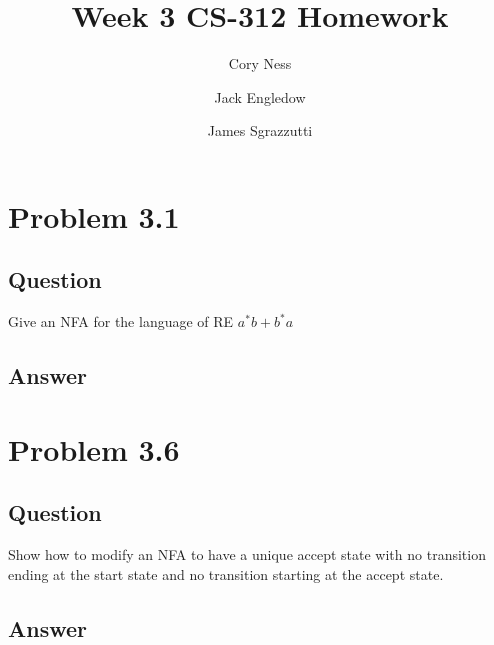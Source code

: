 \documentclass[12pt, a4paper]{article}
\title{Week 3 CS-312 Homework}
\author{
	Cory Ness
	\and
	Jack Engledow
	\and
	James Sgrazzutti
}
\begin{document}
\maketitle

\section{Problem 3.1}
\subsection{Question}
Give an NFA for the language of RE $a^{*}b+b^{*}a$
\subsection{Answer}

\section{Problem 3.6}
\subsection{Question}
Show how to modify an NFA to have a unique accept state with no transition ending at the start state and no transition starting at the accept state.
\subsection{Answer}

\section{Problem 3.7}
\subsection{Question}
If $M$ is a DFA accepting language $B$, then exchanging the accept and reject states gives a new DFA accepting the complement of $B$. Does this work for an NFA? Discuss.
\subsection{Answer}

\section{Problem 3.9}
\subsection{Question}
For the following NFA, use the subset construction to produce an equivalent DFA.
\end{document}
